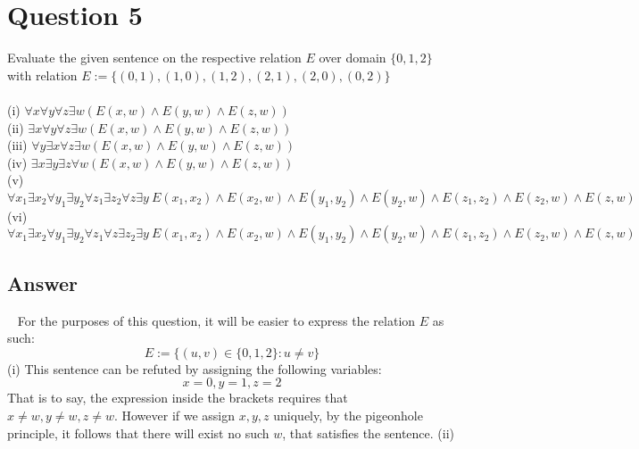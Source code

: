 \documentclass[12pt]{fphw}
\begin{document}
\section*{Question 5}

\begin{problem}
  Evaluate the given sentence on the respective relation $E$ over domain $\{0,1,2\}$ with relation $E := \{(0,1),(1,0),(1,2),(2,1),(2,0),(0,2)\}$\\ \\
  (i) $\forall x \forall y \forall z \exists w (E(x,w) \wedge E(y,w) \wedge E(z,w))$ \\
  (ii) $\exists x \forall y \forall z \exists w (E(x,w) \wedge E(y,w) \wedge E(z,w))$ \\
  (iii) $\forall y \exists x \forall z \exists w (E(x,w) \wedge E(y,w) \wedge E(z,w))$ \\
  (iv) $\exists x \exists y \exists z \forall w (E(x,w) \wedge E(y,w) \wedge E(z,w))$ \\
  (v) $\forall x_1 \exists x_2 \forall y_1 \exists y_2 \forall z_1 \exists z_2 \forall z \exists y \ E(x_1, x_2) \wedge E(x_2, w) \wedge E(y_1, y_2) \wedge E(y_2, w) \wedge E(z_1, z_2) \wedge E(z_2, w) \wedge E(z,w)$ \\
  (vi) $\forall x_1 \exists x_2 \forall y_1 \exists y_2 \forall z_1 \forall z \exists z_2 \exists y \ E(x_1, x_2) \wedge E(x_2, w) \wedge E(y_1, y_2) \wedge E(y_2, w) \wedge E(z_1, z_2) \wedge E(z_2, w) \wedge E(z,w)$
\end{problem}

\subsection*{Answer} \ \newline
For the purposes of this question, it will be easier to express the relation $E$ as such:
$$
E := \{(u,v) \in \{0,1,2\} : u \neq v \}
$$
(i) This sentence can be refuted by assigning the following variables:
$$
x = 0, y = 1, z = 2
$$
That is to say, the expression inside the brackets requires that $x \neq w, y \neq w, z \neq w$. However if we assign $x,y,z$ uniquely, by the pigeonhole principle, it follows that there will exist no such $w$, that satisfies the sentence. \newline \newline
(ii)
\end{document}
